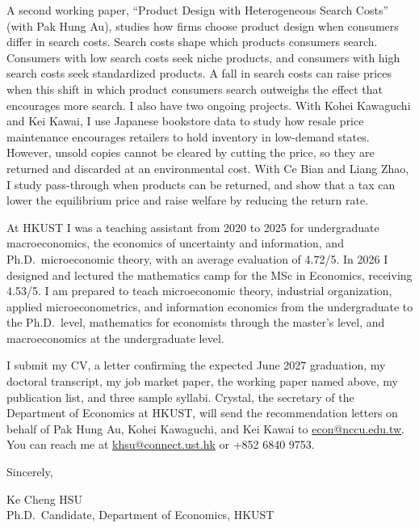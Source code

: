 \documentclass[11pt]{article}
\begin{document}
A second working paper, ``Product Design with Heterogeneous Search Costs'' (with Pak Hung Au), studies how firms choose product design when consumers differ in search costs. Search costs shape which products consumers search. Consumers with low search costs seek niche products, and consumers with high search costs seek standardized products. A fall in search costs can raise prices when this shift in which product consumers search outweighs the effect that encourages more search. I also have two ongoing projects. With Kohei Kawaguchi and Kei Kawai, I use Japanese bookstore data to study how resale price maintenance encourages retailers to hold inventory in low-demand states. However, unsold copies cannot be cleared by cutting the price, so they are returned and discarded at an environmental cost. With Ce Bian and Liang Zhao, I study pass-through when products can be returned, and show that a tax can lower the equilibrium price and raise welfare by reducing the return rate.

At HKUST I was a teaching assistant from 2020 to 2025 for undergraduate macroeconomics, the economics of uncertainty and information, and Ph.D.\ microeconomic theory, with an average evaluation of 4.72/5. In 2026 I designed and lectured the mathematics camp for the MSc in Economics, receiving 4.53/5. I am prepared to teach microeconomic theory, industrial organization, applied microeconometrics, and information economics from the undergraduate to the Ph.D.\ level, mathematics for economists through the master's level, and macroeconomics at the undergraduate level.

I submit my CV, a letter confirming the expected June 2027 graduation, my doctoral transcript, my job market paper, the working paper named above, my publication list, and three sample syllabi. Crystal, the secretary of the Department of Economics at HKUST, will send the recommendation letters on behalf of Pak Hung Au, Kohei Kawaguchi, and Kei Kawai to \href{mailto:econ@nccu.edu.tw}{econ@nccu.edu.tw}. You can reach me at \href{mailto:khsu@connect.ust.hk}{khsu@connect.ust.hk} or +852 6840 9753.

\vspace{0.22em}
Sincerely,

\vspace{0.22em}
Ke Cheng HSU \\
Ph.D.\ Candidate, Department of Economics, HKUST
\end{document}
